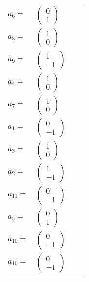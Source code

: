 \documentclass[1p]{elsarticle_modified}
\theoremstyle{definition}
\begin{document}
\begin{tabular}{m{7pt} m{180pt} m{7pt} m{180pt} }
\flushright $a_{6}=$&$\begin{pmatrix}0\\1\end{pmatrix}$ \\
\flushright $a_{8}=$&$\begin{pmatrix}1\\0\end{pmatrix}$ \\
\flushright $a_{9}=$&$\begin{pmatrix}1\\-1\end{pmatrix}$ \\
\flushright $a_{4}=$&$\begin{pmatrix}1\\0\end{pmatrix}$ \\
\flushright $a_{7}=$&$\begin{pmatrix}1\\0\end{pmatrix}$ \\
\flushright $a_{1}=$&$\begin{pmatrix}0\\-1\end{pmatrix}$ \\
\flushright $a_{3}=$&$\begin{pmatrix}1\\0\end{pmatrix}$ \\
\flushright $a_{2}=$&$\begin{pmatrix}1\\-1\end{pmatrix}$ \\
\flushright $a_{11}=$&$\begin{pmatrix}0\\-1\end{pmatrix}$ \\
\flushright $a_{5}=$&$\begin{pmatrix}0\\1\end{pmatrix}$ \\
\flushright $a_{10}=$&$\begin{pmatrix}0\\-1\end{pmatrix}$\\ \flushright $a_{10}=$&$\begin{pmatrix}0\\-1\end{pmatrix}$\\&\end{tabular}
\end{document}
